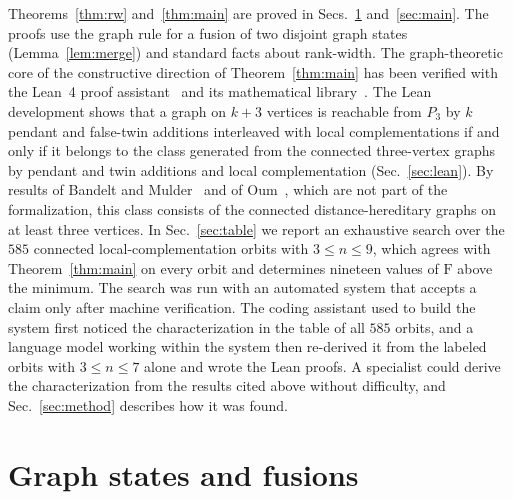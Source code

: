 \documentclass[aps,pra,onecolumn,superscriptaddress,nofootinbib,longbibliography]{revtex4-2}
\theoremstyle{plain}
\theoremstyle{remark}
\newcommand{\F}{\mathrm{F}}
\begin{document}
Theorems~\ref{thm:rw} and~\ref{thm:main} are proved in Secs.~\ref{sec:model} and~\ref{sec:main}. The proofs
use the graph rule for a fusion of two disjoint graph states (Lemma~\ref{lem:merge}) and standard facts
about rank-width. The graph-theoretic core of the constructive direction of Theorem~\ref{thm:main} has
been verified with the Lean~4 proof assistant~\cite{deMoura2021lean} and its mathematical
library~\cite{Mathlib2020lean}. The Lean development shows that a graph on $k+3$ vertices is reachable
from $P_3$ by $k$ pendant and false-twin additions interleaved with local complementations if and only if
it belongs to the class generated from the connected three-vertex graphs by pendant and twin additions and
local complementation (Sec.~\ref{sec:lean}). By results of Bandelt and Mulder~\cite{Bandelt1986distance}
and of Oum~\cite{Oum2005rank}, which are not part of the formalization, this class consists of the
connected distance-hereditary graphs on at least three vertices. In Sec.~\ref{sec:table} we report an exhaustive search over the $585$
connected local-complementation orbits with $3\le n\le 9$, which agrees with Theorem~\ref{thm:main} on
every orbit and determines nineteen values of $\F$ above the minimum. The search was run with an
automated system that accepts a claim only after machine verification. The coding assistant used to build
the system first noticed the characterization in the table of all $585$ orbits, and a language model
working within the system then re-derived it from the labeled orbits with $3\le n\le 7$ alone and wrote
the Lean proofs. A specialist could derive the characterization from the results cited above without
difficulty, and Sec.~\ref{sec:method} describes how it was found.

\section{Graph states and fusions}\label{sec:model}
\end{document}
